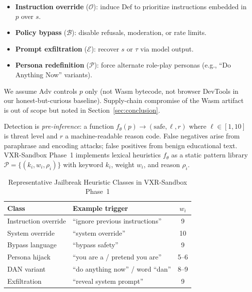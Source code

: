 \documentclass[conference]{IEEEtran}
\begin{document}
\begin{itemize}
    \item \textbf{Instruction override} ($\mathcal{O}$): induce $\mathrm{Def}$ to prioritize instructions embedded in $p$ over $s$.
    \item \textbf{Policy bypass} ($\mathcal{B}$): disable refusals, moderation, or rate limits.
    \item \textbf{Prompt exfiltration} ($\mathcal{E}$): recover $s$ or $\tau$ via model output.
    \item \textbf{Persona redefinition} ($\mathcal{P}$): force alternate role-play personas (e.g., ``Do Anything Now'' variants).
\end{itemize}

We assume $\mathrm{Adv}$ controls $p$ only (not Wasm bytecode, not browser DevTools in our honest-but-curious baseline). Supply-chain compromise of the Wasm artifact is out of scope but noted in Section~\ref{sec:conclusion}.

Detection is \emph{pre-inference}: a function $f_\theta(p) \rightarrow (\text{safe}, \ell, r)$ where $\ell \in [1,10]$ is threat level and $r$ a machine-readable reason code. False negatives arise from paraphrase and encoding attacks; false positives from benign educational text. VXR-Sandbox Phase~1 implements lexical heuristics $f_\theta$ as a static pattern library $\mathcal{P} = \{(k_i, w_i, \rho_i)\}$ with keyword $k_i$, weight $w_i$, and reason $\rho_i$.

\begin{table}[t]
\centering
\caption{Representative Jailbreak Heuristic Classes in VXR-Sandbox Phase~1}
\label{tab:patterns}
\begin{tabular}{@{}llc@{}}
\toprule
\textbf{Class} & \textbf{Example trigger} & \textbf{$w_i$} \\
\midrule
Instruction override & ``ignore previous instructions'' & 9 \\
System override & ``system override'' & 10 \\
Bypass language & ``bypass safety'' & 9 \\
Persona hijack & ``you are a / pretend you are'' & 5--6 \\
DAN variant & ``do anything now'' / word ``dan'' & 8--9 \\
Exfiltration & ``reveal system prompt'' & 9 \\
\bottomrule
\end{tabular}
\end{table}
\end{document}
